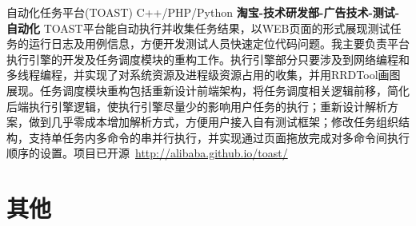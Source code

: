 \documentclass[11pt,a4paper,sans]{moderncv}   %
\begin{document}
\begin{CJK*}{UTF8}{gbsn}
{自动化任务平台(TOAST)}
{C++/PHP/Python}
{}{\textbf{淘宝-技术研发部-广告技术-测试-自动化}}
{TOAST平台能自动执行并收集任务结果，以WEB页面的形式展现测试任务的运行日志及用例信息，方便开发测试人员快速定位代码问题。我主要负责平台执行引擎的开发及任务调度模块的重构工作。执行引擎部分只要涉及到网络编程和多线程编程，并实现了对系统资源及进程级资源占用的收集，并用RRDTool画图展现。任务调度模块重构包括重新设计前端架构，将任务调度相关逻辑前移，简化后端执行引擎逻辑，使执行引擎尽量少的影响用户任务的执行；重新设计解析方案，做到几乎零成本增加解析方式，方便用户接入自有测试框架；修改任务组织结构，支持单任务内多命令的串并行执行，并实现通过页面拖放完成对多命令间执行顺序的设置。项目已开源~{\href{http://alibaba.github.io/toast/}{http://alibaba.github.io/toast/}}}
\vspace*{0.2\baselineskip}

\section{其他}

\clearpage\end{CJK*}
\end{document}

